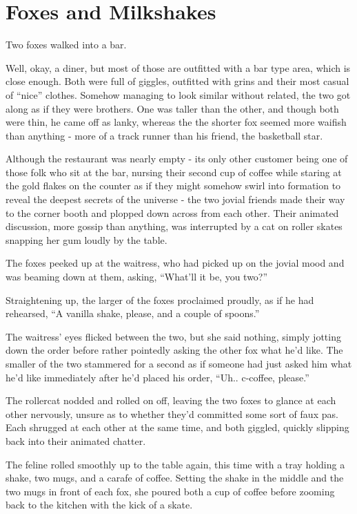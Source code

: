 \hypertarget{foxes-and-milkshakes}{%
\chapter{Foxes and Milkshakes}\label{foxes-and-milkshakes}}

Two foxes walked into a bar.

Well, okay, a diner, but most of those are outfitted with a bar type area, which is close enough. Both were full of giggles, outfitted with grins and their most casual of ``nice'' clothes. Somehow managing to look similar without related, the two got along as if they were brothers. One was taller than the other, and though both were thin, he came off as lanky, whereas the the shorter fox seemed more waifish than anything - more of a track runner than his friend, the basketball star.

Although the restaurant was nearly empty - its only other customer being one of those folk who sit at the bar, nursing their second cup of coffee while staring at the gold flakes on the counter as if they might somehow swirl into formation to reveal the deepest secrets of the universe - the two jovial friends made their way to the corner booth and plopped down across from each other. Their animated discussion, more gossip than anything, was interrupted by a cat on roller skates snapping her gum loudly by the table.

The foxes peeked up at the waitress, who had picked up on the jovial mood and was beaming down at them, asking, ``What'll it be, you two?''

Straightening up, the larger of the foxes proclaimed proudly, as if he had rehearsed, ``A vanilla shake, please, and a couple of spoons.''

The waitress' eyes flicked between the two, but she said nothing, simply jotting down the order before rather pointedly asking the other fox what he'd like. The smaller of the two stammered for a second as if someone had just asked him what he'd like immediately after he'd placed his order, ``Uh.. c-coffee, please.''

The rollercat nodded and rolled on off, leaving the two foxes to glance at each other nervously, unsure as to whether they'd committed some sort of faux pas. Each shrugged at each other at the same time, and both giggled, quickly slipping back into their animated chatter.

The feline rolled smoothly up to the table again, this time with a tray holding a shake, two mugs, and a carafe of coffee. Setting the shake in the middle and the two mugs in front of each fox, she poured both a cup of coffee before zooming back to the kitchen with the kick of a skate.

